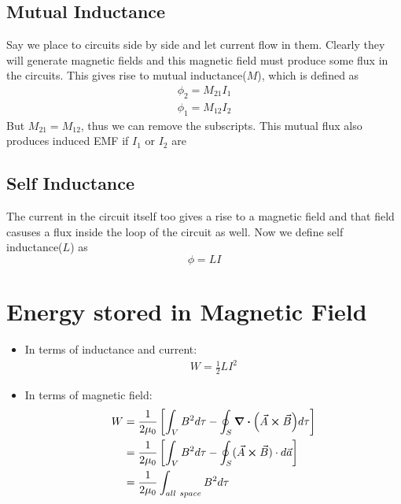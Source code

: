 \documentclass[12pt, oneside]{book}
\begin{document}
\subsection{Mutual Inductance}
Say we place to circuits side by side and let current flow in them. Clearly they will generate magnetic fields and this magnetic field must produce some flux in the circuits. This gives rise to mutual inductance($M$), which is defined as
\begin{gather}
	\phi_2 = M_{21} I_1\\ 
	\phi_1 = M_{12} I_2
\end{gather}
But $M_{21} = M_{12}$, thus we can remove the subscripts. This mutual flux also produces induced EMF if $I_1$ or $I_2$ are 

\subsection{Self Inductance}
The current in the circuit itself too gives a rise to a magnetic field and that field casuses a flux inside the loop of the circuit as well. Now we define self inductance($L$) as
\begin{equation}
	\phi = LI	
\end{equation}

\section{Energy stored in Magnetic Field}
\begin{tcolorbox}[colback=yellow!5!white,colframe=yellow!50!black]
	\begin{itemize}
	    \item In terms of inductance and current:  
	    \begin{gather}
		W = \frac{1}{2}L I^2
	\end{gather}

	    \item In terms of magnetic field:
	    \begin{align}
		W &= \frac{1}{2\mu_0}\left[ \int_{V} B^2 d\tau - \oint_{S} \div (\vec A \cross \vec B) d \tau \right] \\
		&= \frac{1}{2\mu_0}\left[ \int_{V} B^2 d\tau - \oint_{S} (\vec A \cross \vec B) \cdot d \vec a \right]\\
		&= \frac{1}{2\mu_0} \int_{all\ space} B^2 d\tau 
	    \end{align}
	\end{itemize}
\end{tcolorbox}
\end{document}
